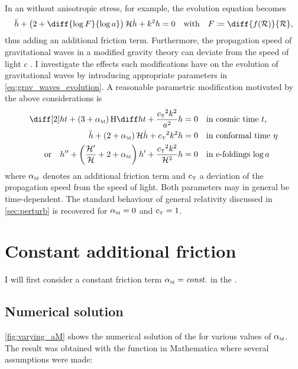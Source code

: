 \documentclass[12pt,parskip=half]{scrreprt}
\begin{document}
In an  without anisotropic stress, for example, the evolution equation becomes \citep{Xu2015,Hwang1996}
\begin{equation}
	\ddconf{h} + \del{2 + \diff{\log{F}}{\efold}} \Hconf \dconf{h} + k^2 h = 0 \quad \text{with} \quad F \defeq \diff{f(\Rscal)}{\Rscal} \eqpunct{,}
\end{equation}
thus adding an additional friction term. Furthermore, the propagation speed of gravitational waves in a modified gravity theory can deviate from the speed of light \(c\) \citep{Amendola2014,Raveri2014}. I investigate the effects such modifications have on the evolution of gravitational waves by introducing appropriate parameters in \eqref{eq:grav_waves_evolution}. A reasonable parametric modification motivated by the above considerations is
\begin{subequations}\label{eq:evolution_friction}
\begin{align}
	\ddt{h} + \del{3 + \alphaM} \Hcosm \dt{h} + \frac{\cT^2 k^2}{a^2} h &= 0 \quad \text{in cosmic time \(t\),} \\
	\ddconf{h} + \del{2 + \alphaM} \Hconf \dconf{h} + \cT^2 k^2 h &= 0 \quad \text{in conformal time \(\conft\)} \\
    \text{or} \quad \ddefold{h} + \del{\frac{\defold{\Hconf}}{\Hconf} + 2 + \alphaM} \defold{h} + \frac{\cT^2 k^2}{\Hconf^2} h &= 0 \quad \text{in e-foldings \(\efold\)}
\end{align}
\end{subequations}
where \({\alpha_{\textnormal{\tiny{M}}}}\) denotes an additional friction term and \({c_{\textnormal{\tiny{T}}}}\) a deviation of the propagation speed from the speed of light. Both parameters may in general be time-dependent. The standard behaviour of general relativity discussed in \autoref{sec:perturb} is recovered for \({\alpha_{\textnormal{\tiny{M}}}}=0\) and \({c_{\textnormal{\tiny{T}}}}=1\).


\section{Constant additional friction}\label{sec:param_friction_const}

I will first consider a constant friction term \({\alpha_{\textnormal{\tiny{M}}}}=\textnormal{\textit{const.}}\) in the .


\subsection{Numerical solution}

\autoref{fig:varying_aM} shows the numerical solution of the  for various values of \({\alpha_{\textnormal{\tiny{M}}}}\). The result was obtained with the  function in Mathematica where several assumptions were made:
\end{document}
